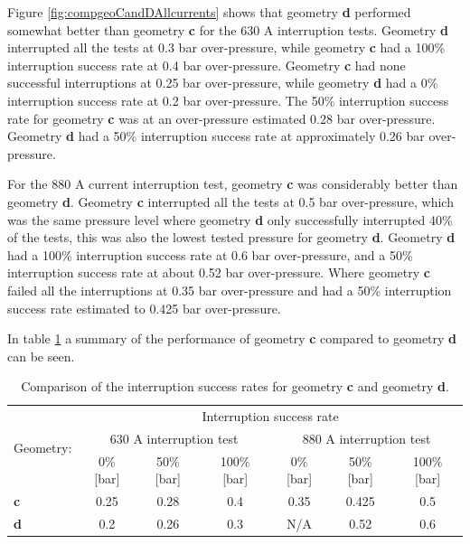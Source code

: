 \documentclass[10pt,b5paper,twoside]{article}
\begin{document}

Figure \ref{fig:compgeoCandDAllcurrents} shows that geometry \textbf{d} performed somewhat better than geometry \textbf{c} for the 630 A interruption tests. Geometry \textbf{d} interrupted all the tests at 0.3 bar over-pressure, while geometry \textbf{c} had a 100\% interruption success rate at 0.4 bar over-pressure. Geometry \textbf{c} had none successful interruptions at 0.25 bar over-pressure, while geometry \textbf{d} had a 0\% interruption success rate at 0.2 bar over-pressure. The 50\% interruption success rate for geometry \textbf{c} was at an over-pressure estimated 0.28 bar over-pressure. Geometry \textbf{d} had a 50\% interruption success rate at approximately 0.26 bar over-pressure.

For the 880 A current interruption test, geometry \textbf{c} was considerably better than geometry \textbf{d}. Geometry \textbf{c} interrupted all the tests at 0.5 bar over-pressure, which was the same pressure level where geometry \textbf{d} only successfully interrupted 40\% of the tests, this was also the lowest tested pressure for geometry \textbf{d}. Geometry \textbf{d} had a 100\% interruption success rate at 0.6 bar over-pressure, and a 50\% interruption success rate at about 0.52 bar over-pressure. Where geometry \textbf{c} failed all the interruptions at 0.35 bar over-pressure and had a 50\% interruption success rate estimated to 0.425 bar over-pressure.

In table \ref{tab:compgeoCandD} a summary of the performance of geometry \textbf{c} compared to geometry \textbf{d} can be seen.

\begin{table}[h]
\center
\caption{Comparison of the interruption success rates for geometry \textbf{c} and geometry \textbf{d}.}
\begin{tabular}{|l|c|c|c|c|c|c|}
\hline
\multirow{3}{*}{Geometry:} & \multicolumn{6}{|c|}{Interruption success rate}                                                           \\ \cline{2-7} 
                          & \multicolumn{3}{|c}{630 A interruption test}        & \multicolumn{3}{|c|}{880 A interruption test}       \\ \cline{2-7} 
                          & 0\% {[}bar{]} & 50\% {[}bar{]} & 100\% {[}bar{]} & 0\% {[}bar{]} & 50\% {[}bar{]} & 100\% {[}bar{]} \\ \hline
\textbf{c}                & 0.25           & 0.28            & 0.4              & 0.35            & 0.425            & 0.5              \\ \hline
\textbf{d}                & 0.2            & 0.26           & 0.3              & N/A           & 0.52            & 0.6              \\ \hline
\end{tabular}
\label{tab:compgeoCandD}
\end{table}
\end{document}

